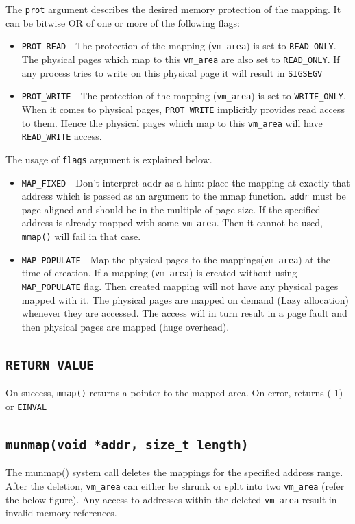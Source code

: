 \documentclass[12pt]{article}
\begin{document}
	
	The {\tt prot} argument describes the desired memory protection of the mapping.  It can be bitwise OR of one or more of the following flags:
	
	\begin{itemize}
        \item {{\tt PROT\_READ}  -  The protection of the mapping ({\tt vm\_area}) is set to {\tt READ\_ONLY}. The physical pages which map to this {\tt vm\_area} are also set to {\tt READ\_ONLY}. If any process tries to write on this physical page it will result in {\tt SIGSEGV}}
        
        \item { {\tt PROT\_WRITE} - The protection of the mapping ({\tt vm\_area}) is set to {\tt WRITE\_ONLY}. When it comes to physical pages, {\tt PROT\_WRITE} implicitly provides read access to them. Hence the physical pages which map to this {\tt vm\_area} will have {\tt READ\_WRITE} access.}
        
    \end{itemize}
    The usage of {\tt flags} argument is explained below.
    
    \begin{itemize}
        \item {{\tt MAP\_FIXED} - Don't interpret addr as a hint: place the mapping at exactly that address which is passed as an argument to the mmap function.  {\tt addr} must be page-aligned and should be in the multiple of page size. If the
			specified address is already mapped with some {\tt vm\_area}. Then it cannot be used, {\tt mmap()} will fail in that case.}
         \item {{\tt MAP\_POPULATE} - Map the physical pages to the mappings({\tt vm\_area}) at the time of creation. If a mapping ({\tt vm\_area}) is created without using {\tt MAP\_POPULATE} flag. Then created mapping will not have any physical pages mapped with it. The physical pages are mapped on demand (Lazy allocation) whenever they are accessed. The access will in turn result in a page fault and then physical pages are mapped (huge overhead). }
    \end{itemize}
\subsection*{\tt RETURN VALUE}
On success, {\tt mmap()} returns a pointer to the mapped area.  On error, returns (-1) or {\tt EINVAL}\\ 

\newpage
\subsection *{\tt munmap(void *addr, size\_t length)}
The munmap() system call deletes the mappings for the specified address range. After the deletion, {\tt vm\_area} can either be shrunk or split into two {\tt vm\_area} (refer the below figure). Any access to addresses within the deleted { \tt vm\_area} result in invalid memory references. 
 
\end{document}
